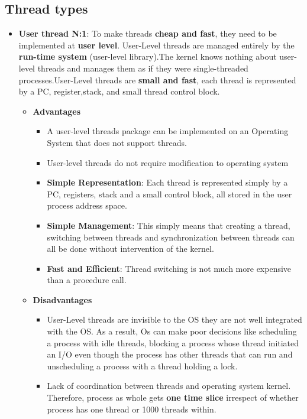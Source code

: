 \documentclass{article}
\begin{document}
\pagebreak
\subsection{Thread types}
\begin{flushleft}
\begin{itemize}
	\item \textbf{User thread N:1}: To make threads \textbf{cheap and fast}, they need to be implemented at \textbf{user level}. User-Level threads are managed entirely by the \textbf{run-time system} (user-level library).The kernel knows nothing about user-level threads and manages them as if they were single-threaded processes.User-Level threads are \textbf{small and fast}, each thread is represented by a PC, register,stack, and small thread control block.
	\begin{itemize}
		\item \textbf{Advantages}
		\begin{itemize}
			\item A user-level threads package can be implemented on an Operating System that does not support threads.
			\item User-level threads do not require modification to operating system
			\item \textbf{Simple Representation}: Each thread is represented simply by a PC, registers, stack and a small control block, all stored in the user process address space.
			\item \textbf{Simple Management}: This simply means that creating a thread, switching between threads and synchronization between threads can all be done without intervention of the kernel.
			\item \textbf{Fast and Efficient}:  Thread switching is not much more expensive than a procedure call.
		\end{itemize}
		\item \textbf{Disadvantages}
		\begin{itemize}
			\item User-Level threads are invisible to the OS they are not well integrated with the OS. As a result, Os can make poor decisions like scheduling a process with idle threads, blocking a process whose thread initiated an I/O even though the process has other threads that can run and unscheduling a process with a thread holding a lock.
			\item Lack of coordination between threads and operating system kernel. Therefore, process as whole gets \textbf{one time slice} irrespect of whether process has one thread or 1000 threads within.

\end{itemize}
\end{itemize}
\end{itemize}
\end{flushleft}
\end{document}

